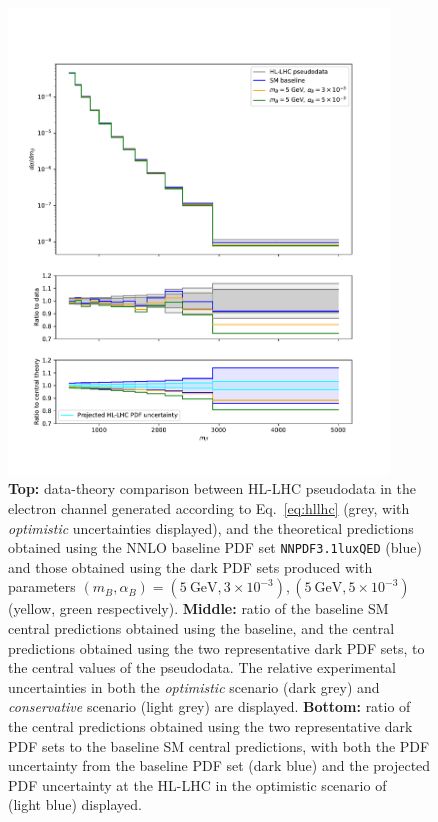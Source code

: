 \documentclass[withindex,glossary]{cam-thesis}
\begin{document}
\begin{figure}
\centering
\includegraphics[width=0.9\textwidth]{darkphoton_figures/data_theory_comparison.pdf}
\caption{\textbf{Top:} data-theory comparison between HL-LHC pseudodata in the electron channel generated according to
  Eq.~\eqref{eq:hllhc} (grey, with \textit{optimistic} uncertainties displayed), and the theoretical predictions obtained using
  the NNLO baseline PDF set {\tt NNPDF3.1luxQED} (blue) and
  those obtained using the dark PDF sets produced with parameters $(m_B,\alpha_B) = (5\ \text{GeV},3\times 10^{-3}), (5\ \text{GeV}, 5 \times 10^{-3})$ (yellow, green respectively).
\textbf{Middle:} ratio of the baseline SM central predictions obtained using the baseline, and the central predictions
  obtained using the two representative dark PDF sets, to the central values of the pseudodata.  The relative experimental
  uncertainties in both the {\it optimistic} scenario (dark grey) and
  {\it conservative} scenario (light grey) are displayed. \textbf{Bottom:} ratio of the central predictions obtained using the two
  representative dark PDF sets to the baseline SM central predictions, with both the PDF uncertainty from the baseline PDF set (dark blue) and the projected PDF uncertainty
  at the HL-LHC in the optimistic scenario of ~\cite{Khalek:2018}
  (light blue) displayed.
} 
\label{fig:data-theory}
\end{figure}
\end{document}
